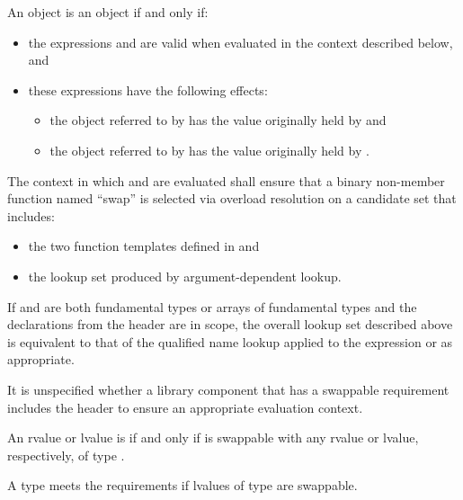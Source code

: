 \pnum
An object  is  an object  if and only if:
\begin{itemize}
\item the expressions  and  are valid when
evaluated in the context described below, and

\item these expressions have the following effects:

\begin{itemize}
\item the object referred to by  has the value originally held by  and
\item the object referred to by  has the value originally held by .
\end{itemize}
\end{itemize}

\pnum
The context in which  and  are evaluated shall
ensure that a binary non-member function named ``swap'' is selected via overload
resolution on a candidate set that includes:
\begin{itemize}
\item the two  function templates defined in
 and

\item the lookup set produced by argument-dependent lookup.
\end{itemize}
\begin{note}
If  and  are both fundamental types or arrays of
fundamental types and the declarations from the header  are in
scope, the overall lookup set described above is equivalent to that of the
qualified name lookup applied to the expression  or
 as appropriate.
\end{note}
\begin{note}
It is unspecified whether a library component that has a swappable
requirement includes the header  to ensure an appropriate
evaluation context.
\end{note}

\pnum
An rvalue or lvalue  is  if and only if  is
swappable with any rvalue or lvalue, respectively, of type .

\pnum
A type  meets the  requirements
if lvalues of type  are swappable.

